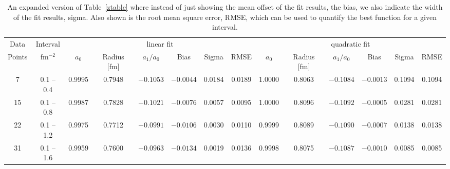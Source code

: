 \documentclass[10pt,aps,prc,twocolumn]{revtex4-1}
\begin{document}
\begin{table}
\caption{An expanded version of Table~\ref{ztable} where instead of just showing the mean offset of the 
fit results, the bias, we also indicate the width of the fit results, sigma.   Also shown is the
root mean square error, RMSE, which can be used to quantify the best function for a given interval.}
\begin{tabular}{cc|cccccc|cccccc} \hline
Data   & Interval     & \multicolumn{6}{c|}{linear fit}                       & \multicolumn{6}{c}{quadratic fit}                    \\ 
Points & fm$^{-2}$ &   $a_0$  & Radius [fm]&  $a_1/a_0$ &  Bias  & Sigma &  RMSE  &   $a_0$  & Radius [fm]& $a_1/a_0$  &  Bias  & Sigma &  RMSE \\  \hline
7      & 0.1 -- 0.4 & 0.9995& 0.7948& $-0.1053$& $-0.0044$& 0.0184& 0.0189 & 1.0000& 0.8063& $-0.1084$& $-0.0013$& 0.1094& 0.1094\\
15     & 0.1 -- 0.8 & 0.9987& 0.7828& $-0.1021$& $-0.0076$& 0.0057& 0.0095 & 1.0000& 0.8096& $-0.1092$& $-0.0005$& 0.0281& 0.0281\\
22     & 0.1 -- 1.2 & 0.9975& 0.7712& $-0.0991$& $-0.0106$& 0.0030& 0.0110 & 0.9999& 0.8089& $-0.1090$& $-0.0007$& 0.0138& 0.0138\\
31     & 0.1 -- 1.6 & 0.9959& 0.7600& $-0.0963$& $-0.0134$& 0.0019& 0.0136 & 0.9998& 0.8075& $-0.1087$& $-0.0010$& 0.0085& 0.0085\\ \hline
\end{tabular}
\label{fulltable}
\end{table}
\end{document}
